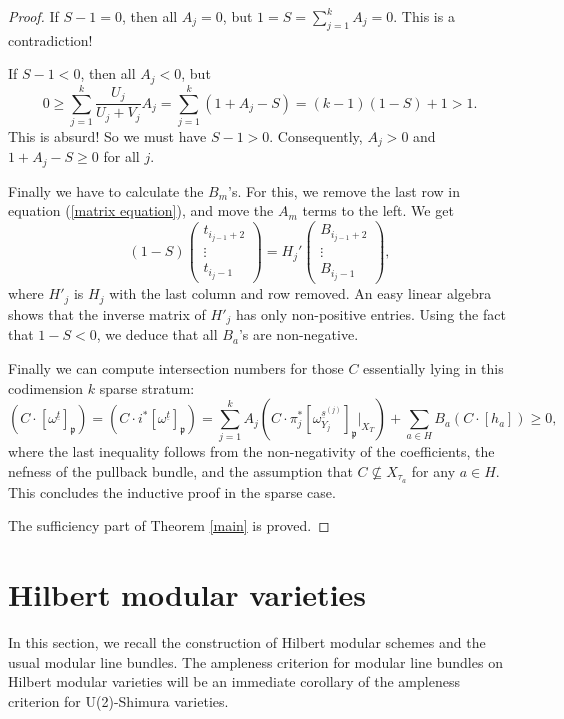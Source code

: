 \documentclass{article}
\begin{document}
\begin{proof}
If $S-1=0$, then all $A_j=0$, but $1=S=\sum_{j=1}^kA_j=0$. This is a contradiction!

If $S-1<0$, then all $A_j<0$, but
\begin{equation}
0\ge \sum_{j=1}^k\frac{U_j}{U_j+V_j}A_j=\sum_{j=1}^k(1+A_j-S)=(k-1)(1-S)+1>1.
\end{equation}
This is absurd! So we must have $S-1>0$. Consequently, $A_j>0$ and $1+A_j-S\ge0$ for all $j$.

Finally we have to calculate the $B_m$'s. For this, we remove the last row in equation (\ref{matrix equation}), and move the $A_m$ terms to the left. We get
\begin{equation}
(1-S)
\left(\begin{matrix}
t_{i_{j-1}+2}\\
\vdots\\
t_{i_j-1}
\end{matrix}\right)
=H_j'
\left(\begin{matrix}
B_{i_{j-1}+2}\\
\vdots\\
B_{i_j-1}
\end{matrix}\right),
\end{equation}
where $H'_j$ is $H_j$ with the last column and row removed. An easy linear algebra shows that the inverse matrix of $H'_j$ has only non-positive entries. Using the fact that $1-S<0$, we deduce that all $B_a$'s are non-negative.

Finally we can compute intersection numbers for those $C$ essentially lying in this codimension $k$ sparse stratum:
\begin{equation}
(C\cdot [\omega^{\underline{t}}]_\mathfrak{p})=(C\cdot i^\ast[\omega^{\underline{t}}]_\mathfrak{p})= \sum_{j=1}^k A_j(C\cdot \pi_j^\ast[\omega^{\underline{s}^{(j)}}_{Y_j}]_\mathfrak{p}\Big|_{X_T})+\sum_{a\in H} B_a(C\cdot[h_a])\ge0,
\end{equation}
where the last inequality follows from the non-negativity of the coefficients, the nefness of the pullback bundle, and the assumption that $C\nsubseteq X_{\tau_a}$ for any $a\in H$. This concludes the inductive proof in the sparse case.

The sufficiency part of Theorem \ref{main} is proved.
\end{proof}





\section{Hilbert modular varieties}
In this section, we recall the construction of Hilbert modular schemes and the usual modular line bundles. The ampleness criterion for modular line bundles on Hilbert modular varieties will be an immediate corollary of the ampleness criterion for U(2)-Shimura varieties.
\end{document}
